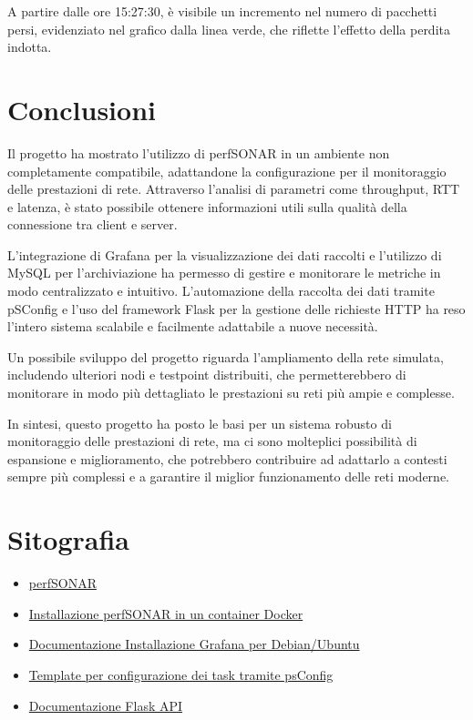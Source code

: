 \documentclass[12pt,a4paper]{report}
\begin{document}
A partire dalle ore 15:27:30, è visibile un incremento nel numero di pacchetti persi, evidenziato nel grafico dalla linea verde, che riflette l’effetto della perdita indotta.











\chapter{Conclusioni}
Il progetto ha mostrato l’utilizzo di perfSONAR in un ambiente non completamente compatibile, adattandone la configurazione per il monitoraggio delle prestazioni di rete. Attraverso l’analisi di parametri come throughput, RTT  e latenza, è stato possibile ottenere informazioni  utili sulla qualità della connessione tra client e server.

L’integrazione di Grafana per la visualizzazione dei dati raccolti e l’utilizzo di MySQL per l’archiviazione ha permesso di gestire e monitorare le metriche in modo centralizzato e intuitivo. L’automazione della raccolta dei dati tramite pSConfig e l’uso del framework Flask per la gestione delle richieste HTTP ha reso l'intero sistema scalabile e facilmente adattabile a nuove necessità.

Un possibile sviluppo del progetto riguarda l’ampliamento della rete simulata, includendo ulteriori nodi e testpoint distribuiti, che permetterebbero di monitorare in modo più dettagliato le prestazioni su reti più ampie e complesse. 



In sintesi, questo progetto ha posto le basi per un sistema robusto di monitoraggio delle prestazioni di rete, ma ci sono molteplici possibilità di espansione e miglioramento, che potrebbero contribuire ad adattarlo a contesti sempre più complessi e a garantire il miglior funzionamento delle reti moderne.
\chapter{Sitografia}

\begin{itemize}
    \item \href{https://docs.perfsonar.net/intro_about.html}{perfSONAR}
    \item \href{https://docs.perfsonar.net/install_docker.html}{Installazione perfSONAR in un container Docker}
    \item \href{https://grafana.com/docs/grafana/latest/setup-grafana/installation/debian/}{Documentazione Installazione Grafana per Debian/Ubuntu}

    \item \href{https://docs.perfsonar.net/psconfig_templates_intro.html}{Template per configurazione dei task tramite psConfig}

    \item \href{https://pythonbasics.org/flask-rest-api/}{Documentazione Flask API}
    
\end{itemize}
\end{document}
